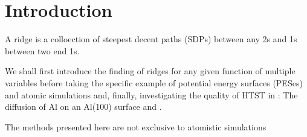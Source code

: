 \section{Introduction}
\label{sec:erm-introduction}

A ridge is a colloection of steepest decent paths (SDPs) between any \sap2s and \sap1s between two end \sap1s.

We shall first introduce the finding of ridges for any given function of multiple variables before taking the specific example of potential energy surfaces (PESes) and atomic simulations and,
finally, investigating the quality of HTST in :
The diffusion of Al on an Al(100) surface and .

\bit
\item The methods presented here are not exclusive to atomistic simulations
\eit

\incomplete
